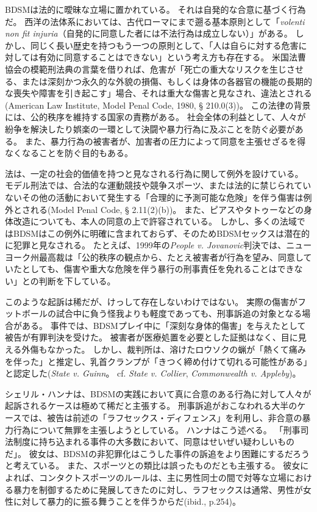 \documentclass[paper=a4,book,openany]{jlreq}
\begin{document}
BDSMは法的に曖昧な立場に置かれている。
それは自発的な合意に基づく行為だ。
西洋の法体系においては、古代ローマにまで遡る基本原則として「\emph{volenti non fit injuria}（自発的に同意した者には不法行為は成立しない）」がある。
しかし、同じく長い歴史を持つもう一つの原則として、「人は自らに対する危害に対しては有効に同意することはできない」という考え方も存在する。
米国法曹協会の模範刑法典の言葉を借りれば、危害が「死亡の重大なリスクを生じさせる、または深刻かつ永久的な外貌の損傷、もしくは身体の各器官の機能の長期的な喪失や障害を引き起こす」場合、それは重大な傷害と見なされ、違法とされる(American Law Institute, Model Penal Code, 1980, § 210.0(3))。
この法律の背景には、公的秩序を維持する国家の責務がある。
社会全体の利益として、人々が紛争を解決したり娯楽の一環として決闘や暴力行為に及ぶことを防ぐ必要がある。
また、暴力行為の被害者が、加害者の圧力によって同意を主張せざるを得なくなることを防ぐ目的もある。

法は、一定の社会的価値を持つと見なされる行為に関して例外を設けている。
モデル刑法では、合法的な運動競技や競争スポーツ、または法的に禁じられていないその他の活動において発生する「合理的に予測可能な危険」を伴う傷害は例外とされる(Model Penal Code, § 2.11(2)(b))。
また、ピアスやタトゥーなどの身体改造についても、本人の同意の上で許容されている。
しかし、多くの法域ではBDSMはこの例外に明確に含まれておらず、そのためBDSMセックスは潜在的に犯罪と見なされる。
たとえば、1999年の\emph{People v. Jovanovic}判決では、ニューヨーク州最高裁は「公的秩序の観点から、たとえ被害者が行為を望み、同意していたとしても、傷害や重大な危険を伴う暴行の刑事責任を免れることはできない」との判断を下している。

このような起訴は稀だが、けっして存在しないわけではない。
実際の傷害がフットボールの試合中に負う怪我よりも軽度であっても、刑事訴追の対象となる場合がある。
事件では、BDSMプレイ中に「深刻な身体的傷害」を与えたとして被告が有罪判決を受けた。
被害者が医療処置を必要とした証拠はなく、目に見える外傷もなかった。
しかし、裁判所は、溶けたロウソクの蝋が「熱くて痛みを伴った」と推定し、乳首クランプが「きつく締め付けて切れる可能性がある」と認定した(\emph{State v. Guinn}。
cf.  \emph{State v. Collier}, \emph{Commonwealth v. Appleby})。

シェリル・ハンナは、BDSMの実践において真に合意のある行為に対して人々が起訴されるケースは極めて稀だと主張する。
刑事訴追がおこなわれる大半のケースでは、被告は前述の「ラフセックス・ディフェンス」を利用し、非合意の暴力行為について無罪を主張しようとしている。
ハンナはこう述べる。
「刑事司法制度に持ち込まれる事件の大多数において、同意はせいぜい疑わしいものだ」\citep[p.248]{hanna01:_sex_is_not_sport}。
彼女は、BDSMの非犯罪化はこうした事件の訴追をより困難にするだろうと考えている。
また、スポーツとの類比は誤ったものだとも主張する。
彼女によれば、コンタクトスポーツのルールは、主に男性同士の間で対等な立場における暴力を制御するために発展してきたのに対し、ラフセックスは通常、男性が女性に対して暴力的に振る舞うことを伴うからだ(ibid., p.254)。
\end{document}
